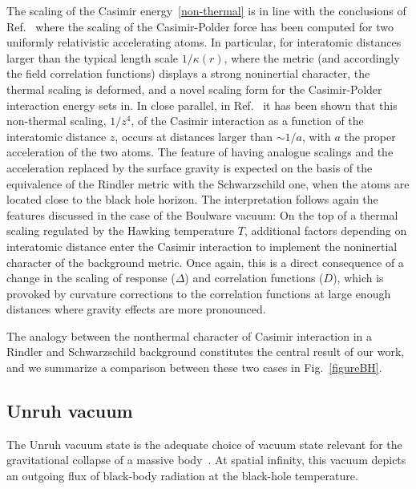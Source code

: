 \documentclass[twocolumn,prd,aps,showpacs,amsmath,amssymb]{revtex4-1}
\begin{document}
The scaling of the Casimir energy~\eqref{non-thermal}  is in line with the conclusions of Ref.~\cite{marino} where the scaling of the Casimir-Polder force has been computed for two uniformly relativistic accelerating atoms. 
%
 In particular, for interatomic distances larger than the typical length scale
 $1/\kappa(r)$, where the metric (and accordingly the field
 correlation functions) displays a strong noninertial character, the
 thermal scaling is deformed, and a novel scaling form for  the
 Casimir-Polder interaction energy sets in. In close parallel, in
 Ref.~\cite{marino} it has been shown that this non-thermal scaling,
 $1/z^4$, of the Casimir interaction as a function of the interatomic
 distance $z$, occurs at distances larger than $\sim1/a$, with $a$
  the proper acceleration of the two atoms. 
The feature of having analogue scalings and the acceleration replaced by the surface gravity  is expected on the basis of the equivalence of the Rindler metric with the Schwarzschild one, when the atoms are located close to the black hole horizon.
%
The interpretation follows again the features discussed in the case of
the Boulware vacuum: On the top of a thermal scaling regulated by the
Hawking temperature $T$, additional factors depending on interatomic
distance enter the Casimir interaction to implement the
noninertial character of the background metric. Once again, this is a
direct consequence of a change in the scaling of response ($\Delta$)
and correlation functions ($D$), which is provoked by curvature
corrections to the correlation functions at large enough distances
where gravity effects are more pronounced. 

The analogy between the nonthermal character of Casimir interaction
in a Rindler and Schwarzschild background  constitutes the central
result of our work, and we summarize a comparison between these two cases in
Fig.~\ref{figureBH}. 


\subsection{Unruh vacuum}
\label{Unruh}

The Unruh vacuum state is the adequate choice of vacuum state relevant for the gravitational collapse of a massive body~\cite{sciama,unruh}. At spatial infinity, this vacuum depicts an outgoing flux of black-body radiation at the black-hole temperature.  
\end{document}
